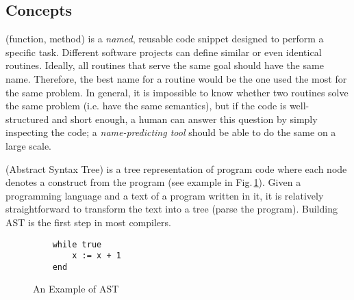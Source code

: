 \documentclass[12pt]{article}
\begin{document}
\subsection{Concepts}

 (function, method) is a \emph{named}, reusable code snippet designed to perform a specific task.
Different software projects can define similar or even identical routines.
Ideally, all routines that serve the same goal should have the same name.
Therefore, the best name for a routine would be the one used the most for the same problem.
In general, it is impossible to know whether two routines solve the same problem
(i.e. have the same semantics), 
but if the code is well-structured and short enough, 
a human can answer this question by simply inspecting the code;
a \textit{name-predicting tool} should be able to do the same on a large scale.


 (Abstract Syntax Tree) is a tree representation of program code where each node denotes
a construct from the program (see example in Fig.\,\ref{fig:ast}).
Given a programming language and a text of a program written in it, 
it is relatively straightforward
to transform the text into a tree (parse the program). 
Building AST is the first step in most compilers.

\begin{figure}
\centering
\begin{minipage}{5cm}
\begin{verbatim}
    while true
        x := x + 1
    end
\end{verbatim}
\end{minipage}
\begin{minipage}{6cm}
\centering
{}
\end{minipage}
    \caption{An Example of AST}
    \label{fig:ast}
\end{figure}
  
\end{document}
